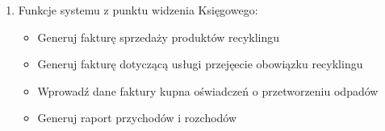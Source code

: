 \begin{enumerate}
\item Funkcje systemu z punktu widzenia Księgowego:
	\begin{itemize}
		\item Generuj fakturę sprzedaży produktów recyklingu
		\item Generuj fakturę dotyczącą usługi przejęecie obowiązku recyklingu
		\item Wprowadź dane faktury kupna oświadczeń o przetworzeniu odpadów
		\item Generuj raport przychodów i rozchodów
	\end{itemize}

\end{enumerate}
